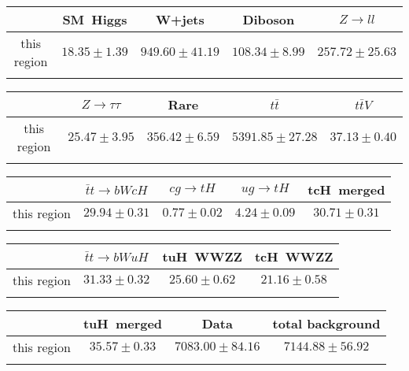 \centering
\begin{tabular}{ccccc} \toprule\toprule
 & SM~Higgs & W+jets & Diboson & $Z\to ll$\\\midrule
this region & $18.35\pm1.39$ & $949.60\pm41.19$ & $108.34\pm8.99$ & $257.72\pm25.63$\\
\bottomrule\bottomrule\\
\end{tabular}
\begin{tabular}{ccccc} \toprule\toprule
 & $Z\to \tau\tau$ & Rare & $t\bar{t}$ & $t\bar{t}V$\\\midrule
this region & $25.47\pm3.95$ & $356.42\pm6.59$ & $5391.85\pm27.28$ & $37.13\pm0.40$\\
\bottomrule\bottomrule\\
\end{tabular}
\begin{tabular}{ccccc} \toprule\toprule
 & $\bar{t}t\to bWcH$ & $cg\to tH$ & $ug\to tH$ & tcH~merged\\\midrule
this region & $29.94\pm0.31$ & $0.77\pm0.02$ & $4.24\pm0.09$ & $30.71\pm0.31$\\
\bottomrule\bottomrule\\
\end{tabular}
\begin{tabular}{cccc} \toprule\toprule
 & $\bar{t}t\to bWuH$ & tuH~WWZZ & tcH~WWZZ\\\midrule
this region & $31.33\pm0.32$ & $25.60\pm0.62$ & $21.16\pm0.58$\\
\bottomrule\bottomrule\\
\end{tabular}
\begin{tabular}{cccc} \toprule\toprule
 & tuH~merged & Data & total background\\\midrule
this region & $35.57\pm0.33$ & $7083.00\pm84.16$ & $7144.88\pm56.92$\\
\bottomrule\bottomrule\\
\end{tabular}
